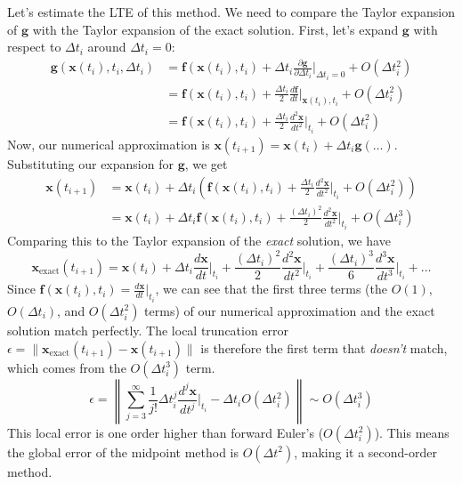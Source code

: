 Let's estimate the LTE of this method. We need to compare the Taylor expansion of $\mathbf{g}$ with the Taylor expansion of the exact solution. First, let's expand $\mathbf{g}$ with respect to $\Delta t_i$ around $\Delta t_i = 0$:
\begin{align*}
    \mathbf{g}(\mathbf{x}(t_i), t_i, \Delta t_i) &= \mathbf{f}(\mathbf{x}(t_i), t_i) + \Delta t_i \frac{\partial \mathbf{g}}{\partial \Delta t_i}\bigg|_{\Delta t_i=0} + O(\Delta t_i^2) \\
    &= \mathbf{f}(\mathbf{x}(t_i), t_i) + \frac{\Delta t_i}{2} \frac{d\mathbf{f}}{dt}\bigg|_{\mathbf{x}(t_i), t_i} + O(\Delta t_i^2) \\
    &= \mathbf{f}(\mathbf{x}(t_i), t_i) + \frac{\Delta t_i}{2} \frac{d^2\mathbf{x}}{dt^2}\bigg|_{t_i} + O(\Delta t_i^2)
\end{align*}
Now, our numerical approximation is $\mathbf{x}(t_{i+1}) = \mathbf{x}(t_i) + \Delta t_i \mathbf{g}(\dots)$. Substituting our expansion for $\mathbf{g}$, we get
\begin{align*}
    \mathbf{x}(t_{i+1}) &= \mathbf{x}(t_i) + \Delta t_i \left( \mathbf{f}(\mathbf{x}(t_i), t_i) + \frac{\Delta t_i}{2} \frac{d^2\mathbf{x}}{dt^2}\bigg|_{t_i} + O(\Delta t_i^2) \right) \\
    &= \mathbf{x}(t_i) + \Delta t_i \mathbf{f}(\mathbf{x}(t_i), t_i) + \frac{(\Delta t_i)^2}{2} \frac{d^2\mathbf{x}}{dt^2}\bigg|_{t_i} + O(\Delta t_i^3)
\end{align*}
Comparing this to the Taylor expansion of the \textit{exact} solution, we have
\begin{equation}
    \mathbf{x}_{\text{exact}}(t_{i+1}) = \mathbf{x}(t_i) + \Delta t_i \frac{d\mathbf{x}}{dt}\bigg|_{t_i} + \frac{(\Delta t_i)^2}{2} \frac{d^2\mathbf{x}}{dt^2}\bigg|_{t_i} + \frac{(\Delta t_i)^3}{6} \frac{d^3\mathbf{x}}{dt^3}\bigg|_{t_i} + \dots
\end{equation}
Since $\mathbf{f}(\mathbf{x}(t_i), t_i) = \frac{d\mathbf{x}}{dt}\big|_{t_i}$, we can see that the first three terms (the $O(1)$, $O(\Delta t_i)$, and $O(\Delta t_i^2)$ terms) of our numerical approximation and the exact solution match perfectly. The local truncation error $\epsilon = \| \mathbf{x}_{\text{exact}}(t_{i+1}) - \mathbf{x}(t_{i+1}) \|$ is therefore the first term that \textit{doesn't} match, which comes from the $O(\Delta t_i^3)$ term.
\begin{equation}
    \epsilon = \left\| \sum_{j=3}^{\infty} \frac{1}{j!} \Delta t_i^j \frac{d^j \mathbf{x}}{dt^j}\bigg|_{t_i} - \Delta t_i O(\Delta t_i^2) \right\| \sim O(\Delta t_i^3)
\end{equation}
This local error is one order higher than forward Euler's ($O(\Delta t_i^2)$). This means the global error of the midpoint method is $O(\Delta t^2)$, making it a second-order method.

